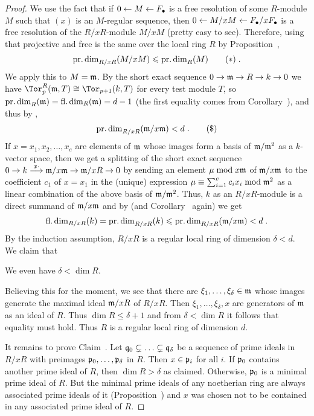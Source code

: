 \documentclass[a4paper,parskip=half,numbers=enddot, DIV=12]{scrreprt}
\renewcommand{\leq}{\leqslant}
\begin{document}
\begin{proof}
	We use the fact that if $0\lmorphism M\lmorphism F_\bullet$ is a free resolution of some $R$-module $M$ such that $(x)$ is an $M$-regular sequence, then $0\lmorphism M/xM\lmorphism F_\bullet/xF_\bullet$ is a free resolution of the $R/xR$-module $M/xM$ (pretty easy to see). Therefore, using that projective and free is the same over the local ring $R$ by Proposition~,
	\begin{align}\lbl{eq:pdimOfM/xMandM}
		\pdim_{R/xR}(M/xM)\leq \pdim_R(M)\tag{$*$}\;.
	\end{align}
	We apply this to $M=\mathfrak{m}$. By the short exact sequence $0\morphism\mm\morphism R\morphism k\morphism 0$ we have $\Tor_p^R(\mm,T)\cong\Tor_{p+1}(k,T)$ for every test module $T$, so $\operatorname{pr.dim}_R(\mathfrak{m})=\operatorname{fl.dim}_R(\mathfrak{m})=d-1$ (the first equality comes from Corollary~), and thus by ,
	\begin{align}\lbl{eq:pdimIneq2}
		\pdim_{R/xR}(\mm/x\mm)<d\;.\tag{\$}
	\end{align}
	If $x=x_1,x_2,\ldots,x_e$ are elements of $\mathfrak{m}$ whose images form a basis of $\mathfrak{m}/\mathfrak{m}^2$ as a $k$-vector space, then we get a splitting of the short exact sequence $0\morphism k\morphism[x\cdot ]\mm/x\mm\morphism\mm/xR\morphism 0$
	by sending an element $\mu\bmod x\mathfrak{m}$ of $\mathfrak{m}/x\mathfrak{m}$ to the coefficient $c_1$ of $x=x_1$ in the (unique) expression $\mu\equiv\sum_{i=1}^ec_ix_i\bmod\mathfrak{m}^2$ as a linear combination of the above basis of $\mathfrak{m}/\mathfrak{m}^2$. Thus, $k$ as an $R/xR$-module is a direct summand of $\mathfrak{m}/x\mathfrak{m}$ and by  (and Corollary~ again) we get
	\begin{align*}
		\fdim_{R/xR}(k)= \pdim_{R/xR}(k)\leq \pdim_{R/xR}(\mm/x\mm)<d\;.
	\end{align*}
	By the induction assumption, $R/xR$ is a regular local ring of dimension $\delta<d$. We claim that
	\begin{claim}
		We even have $\delta<\dim R$.
	\end{claim}
	Believing this for the moment, we see that there are $\xi_1,\ldots,\xi_\delta\in\mathfrak{m}$ whose images generate the maximal ideal $\mathfrak{m}/xR$ of $R/xR$. Then $\xi_1,\ldots,\xi_\delta,x$ are generators of $\mathfrak{m}$ as an ideal of $R$. Thus $\dim R\leq \delta+1$ and from $\delta<\dim R$ it follows that equality must hold. Thus $R$ is a regular local ring of dimension $d$.
	
	It remains to prove Claim~. Let $\mathfrak{q}_0\subsetneq\ldots\subsetneq\mathfrak{q}_\delta$ be a sequence of prime ideals in $R/xR$ with preimages $\mathfrak{p}_0,\ldots,\mathfrak{p}_\delta$ in $R$. Then $x\in\mathfrak{p}_i$ for all $i$. If $\mathfrak{p}_0$ contains another prime ideal of $R$, then $\dim R>\delta$ as claimed. Otherwise, $\mathfrak{p}_0$ is a minimal prime ideal of $R$. But the minimal prime ideals of any noetherian ring are always associated prime ideals of it (Proposition~) and $x$ was chosen not to be contained in any associated prime ideal of $R$.
\end{proof}
\end{document}
